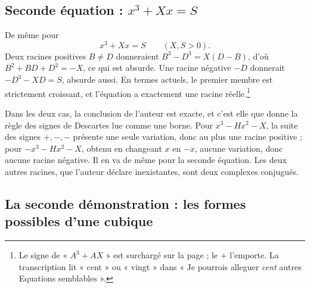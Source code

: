 \documentclass[11pt,a4paper]{article}
\begin{document}
\subsection*{Seconde équation : \(x^3+Xx=S\)}

De même pour
\[
x^3+Xx=S \qquad (X,S>0).
\]
Deux racines positives \(B\neq D\) donneraient
\(B^3-D^3=X(D-B)\), d'où \(B^2+BD+D^2=-X\), ce qui est absurde. Une racine
négative \(-D\) donnerait \(-D^3-XD=S\), absurde aussi. En termes actuels, le
premier membre est strictement croissant, et l'équation a exactement une racine
réelle.\footnote{Le signe de « \(A^3+AX\) » est surchargé sur la page ; le \(+\)
l'emporte. La transcription lit « cent » ou « vingt » dans « Je pourrois
alleguer \emph{cent} autres Equations semblables ».}

Dans les deux cas, la conclusion de l'auteur est exacte, et c'est elle que
donne la règle des signes de Descartes lue comme une borne. Pour
\(x^3-Hx^2-X\), la suite des signes \(+,-,-\) présente une seule variation,
donc au plus une racine positive ; pour \(-x^3-Hx^2-X\), obtenu en changeant
\(x\) en \(-x\), aucune variation, donc aucune racine négative. Il en va de
même pour la seconde équation. Les deux autres racines, que l'auteur déclare
inexistantes, sont deux complexes conjugués.

\subsection*{La seconde démonstration : les formes possibles d'une cubique}
\end{document}
